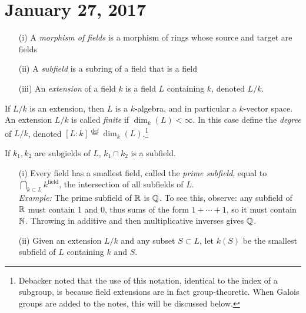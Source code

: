 \section{January 27, 2017}

\begin{defn}
\hspace{0.5cm}
\begin{enumerate}
\item[(i)] A \textit{morphism of fields} is a morphism of rings whose source and target are fields
\item[(ii)] A \textit{subfield} is a subring of a field that is a field
\item[(iii)] An \textit{extension} of a field $k$ is a field $L$ containing $k$, denoted $L/k$.
\end{enumerate}
\end{defn}
 
\begin{rmk}
If $L/k$ is an extension, then $L$ is a $k$-algebra, and in particular a $k$-vector space. An extension $L/k$ is called \textit{finite} if $\dim_k(L) < \infty$. In this case define the \textit{degree} of $L/k$, denoted $[L : k] \stackrel{\text{def}}{=} \dim_k(L)$.\footnote{Debacker noted that the use of this notation, identical to the index of a subgroup, is because field extensions are in fact group-theoretic. When Galois groups are added to the notes, this will be discussed below.}
 \end{rmk}
 
\begin{fact}
 If $k_1, k_2$ are subgields of $L$, $k_1 \cap k_2$ is a subfield.
\end{fact}

\begin{defn}
\hspace{0.5cm}
\begin{enumerate}
\item[(i)] Every field has a smallest field, called the \textit{prime subfield}, equal to $\bigcap_{k \subset L} k^{\text{field}}$, the intersection of all subfields of $L$. \\
\textit{Example:} The prime subfield of $\mathbb{R}$ is $\mathbb{Q}$. To see this, observe: any subfield of $\mathbb{R}$ must contain 1 and 0, thus sums of the form $1 + \cdots + 1$, so it must contain $\mathbb{N}$. Throwing in additive and then multiplicative inverses gives $\mathbb{Q}$.
\item[(ii)] Given an extension $L/k$ and any subset $S \subset L$, let $k(S)$ be the smallest subfield of $L$ containing $k$ and $S$. 
\end{enumerate}
\end{defn}

